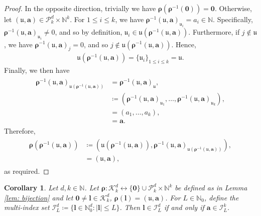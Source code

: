 \documentclass[pdflatex,sn-mathphys-num]{sn-jnl}%
\theoremstyle{thmstyleone}%
\newtheorem{corollary}{Corollary}
\theoremstyle{thmstyletwo}%
\theoremstyle{thmstylethree}%
\begin{document}
\begin{appendices}
\begin{proof}
In the opposite direction, trivially we have \(\boldsymbol{\rho}(\boldsymbol{\rho}^{-1}(\mathbf{0}))=\mathbf{0}\). Otherwise, let \((\mathfrak{u},\mathbf{a})\in\mathcal{P}^d_k\times\mathbb{N}^k\). For \(1\leq i\leq k\), we have \(\boldsymbol{\rho}^{-1}(\mathfrak{u},\mathbf{a})_{\mathfrak{u}_i}= a_i\in\mathbb{N}\). Specifically, \(\boldsymbol{\rho}^{-1}(\mathfrak{u},\mathbf{a})_{\mathfrak{u}_i}\neq0\), and so by definition, \(\mathfrak{u}_i\in\mathfrak{u}(\boldsymbol{\rho}^{-1}(\mathfrak{u},\mathbf{a}))\). Furthermore, if \(j\notin\mathfrak{u}\), we have \(\boldsymbol{\rho}^{-1}(\mathfrak{u},\mathbf{a})_j=0\), and so \(j\notin\mathfrak{u}(\boldsymbol{\rho}^{-1}(\mathfrak{u},\mathbf{a}))\). Hence,
\begin{align}
    \mathfrak{u}(\boldsymbol{\rho}^{-1}(\mathfrak{u},\mathbf{a}))=\{\mathfrak{u}_i\}_{1\leq i \leq k}=\mathfrak{u}.\nonumber
\end{align}
Finally, we then have
\begin{align}
    \begin{split}
    \boldsymbol{\rho}^{-1}(\mathfrak{u},\mathbf{a})_{\mathfrak{u}(\boldsymbol{\rho}^{-1}(\mathfrak{u},\mathbf{a}))}&=\boldsymbol{\rho}^{-1}(\mathfrak{u},\mathbf{a})_{\mathfrak{u}},\\
    &\coloneqq\left(\boldsymbol{\rho}^{-1}(\mathfrak{u},\mathbf{a})_{\mathfrak{u}_1},\dots,\boldsymbol{\rho}^{-1}(\mathfrak{u},\mathbf{a})_{\mathfrak{u}_k}\right),\\
    &=(a_{1},\dots,a_{k}), \\
    &= \mathbf{a}.
    \end{split}\nonumber
\end{align}
Therefore,
\begin{align}
    \begin{split}
    \boldsymbol{\rho}(\boldsymbol{\rho}^{-1}(\mathfrak{u},\mathbf{a}))&\coloneqq\left(\mathfrak{u}(\boldsymbol{\rho}^{-1}(\mathfrak{u},\mathbf{a})),\boldsymbol{\rho}^{-1}(\mathfrak{u},\mathbf{a})_{\mathfrak{u}(\boldsymbol{\rho}^{-1}(\mathfrak{u},\mathbf{a}))}\right),\\
    &=(\mathfrak{u},\mathbf{a}),\nonumber
    \end{split}
\end{align}
as required.
\end{proof}


\begin{corollary}\label{cor: level sets}
    Let \(d,k\in\mathbb{N}\). Let \(\boldsymbol{\rho}:\mathcal{K}_k^d \leftrightarrow\{\mathbf{0}\}\cup\mathcal{P}^d_k\times\mathbb{N}^k\) be defined as in Lemma \ref{lem: bijection} and let \(\mathbf{0}\neq\boldsymbol{l}\in\mathcal{K}_k^d\), \(\boldsymbol{\rho}(\boldsymbol{l})=(\mathfrak{u},\mathbf{a})\). For \(L\in\mathbb{N}_0\), define the multi-index set \(\mathcal{I}_L^d\coloneqq\{\boldsymbol{l}\in\mathbb{N}_0^d:|\boldsymbol{l}|\leq L\}\). Then \(\boldsymbol{l}\in\mathcal{I}_L^d\) if and only if \(\mathbf{a}\in\mathcal{I}_L^k\).
\end{corollary}


\end{appendices}
\end{document}
